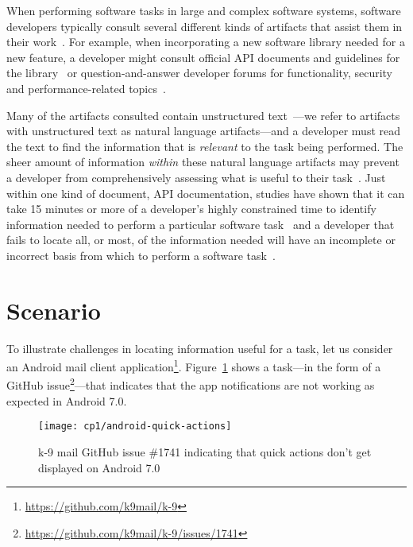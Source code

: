 

When performing software tasks in large and complex software systems, software developers typically consult several different kinds of artifacts that assist them in their work~\cite{Starke2009, Meyer2017}. For example, 
when incorporating a new software library needed for a new feature, a developer might consult official API documents and guidelines for the library~\cite{robillard2011field, umarji2008archetypal} or 
 question-and-answer developer forums for functionality, security and performance-related topics~\cite{parnin2012, silva2019}.



Many of the artifacts consulted
contain unstructured text~\cite{Bavota2016}---we refer to artifacts with unstructured text as natural language artifacts---and 
a developer must read the text to find the information that is \textit{relevant} to the task being performed. 
The sheer amount of information \textit{within} these natural language artifacts may prevent a developer from comprehensively assessing what is useful to their task~\cite{Murphy2005}.
 Just within one kind of document, API
documentation, studies have shown that it can take 15 minutes or more
of a developer's highly constrained time to identify 
information needed to perform a particular software task~\cite{endrikat2014, Meyer2017}
and a developer that fails to locate all, or most, of the information needed
 will have an incomplete or incorrect basis from which to perform a software task~\cite{Murphy2005}.



 \section{Scenario}
 \label{cp1:example}
 
 
 
 
 To illustrate challenges in locating information useful for a task, let us consider an  Android mail client application\footnote{\url{https://github.com/k9mail/k-9}}.
 Figure~\ref{fig:android-notifications-task} shows a task---in the form of a GitHub issue\footnote{\url{https://github.com/k9mail/k-9/issues/1741}}---that indicates that the app notifications 
 are not working as expected in Android 7.0. 
 
 \medskip
 \begin{figure}[h!]
     \centering
     \texttt{[image: cp1/android-quick-actions]}
     \caption{k-9 mail GitHub issue \#1741 indicating that quick actions don't get displayed on Android 7.0}
     \label{fig:android-notifications-task}
 \end{figure}
 
